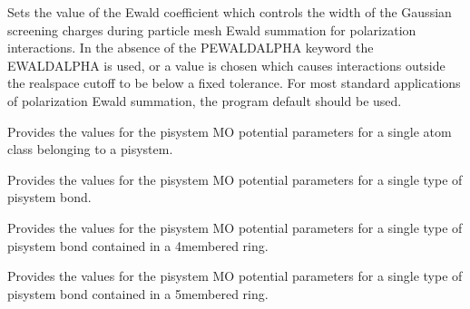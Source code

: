 \documentclass[letterpaper,11pt,english]{sphinxmanual}
\begin{document}
\ignorespaces {}\label{\detokenize{text/keywords:key-pewald-alpha}}\begin{description}
\sphinxAtStartPar
Sets the value of the Ewald coefficient which controls the width of the Gaussian screening charges during particle mesh Ewald summation for polarization interactions. In the absence of the PEWALD\sphinxhyphen{}ALPHA keyword the EWALD\sphinxhyphen{}ALPHA is used, or a value is chosen which causes interactions outside the real\sphinxhyphen{}space cutoff to be below a fixed tolerance. For most standard applications of polarization Ewald summation, the program default should be used.

\end{description}

\ignorespaces {}\label{\detokenize{text/keywords:key-piatom}}\begin{description}
\sphinxAtStartPar
Provides the values for the pisystem MO potential parameters for a single atom class belonging to a pisystem.

\end{description}

\ignorespaces {}\label{\detokenize{text/keywords:key-pibond}}\begin{description}
\sphinxAtStartPar
Provides the values for the pisystem MO potential parameters for a single type of pisystem bond.

\end{description}

\ignorespaces {}\label{\detokenize{text/keywords:key-pibond4}}\begin{description}
\sphinxAtStartPar
Provides the values for the pisystem MO potential parameters for a single type of pisystem bond contained in a 4\sphinxhyphen{}membered ring.

\end{description}

\ignorespaces {}\label{\detokenize{text/keywords:key-pibond5}}\begin{description}
\sphinxAtStartPar
Provides the values for the pisystem MO potential parameters for a single type of pisystem bond contained in a 5\sphinxhyphen{}membered ring.

\end{description}
\end{document}
